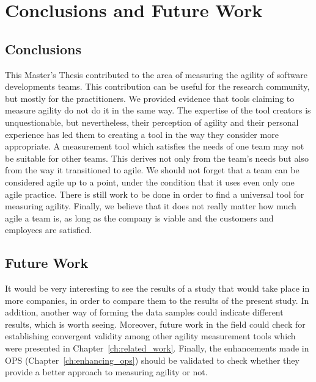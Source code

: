 \chapter{Conclusions and Future Work}
\label{ch:conclusions_future_work}

\section{Conclusions}

This Master's Thesis contributed to the area of measuring the agility of software developments teams. This contribution can be useful for the research community, but mostly for the practitioners. We provided evidence that tools claiming to measure agility do not do it in the same way. The expertise of the tool creators is unquestionable, but nevertheless, their perception of agility and their personal experience has led them to creating a tool in the way they consider more appropriate. A measurement tool which satisfies the needs of one team may not be suitable for other teams. This derives not only from the team's needs but also from the way it transitioned to agile. We should not forget that a team can be considered agile up to a point, under the condition that it uses even only one agile practice. There is still work to be done in order to find a universal tool for measuring agility. Finally, we believe that it does not really matter how much agile a team is, as long as the company is viable and the customers and employees are satisfied.

\section{Future Work}

It would be very interesting to see the results of a study that would take place in more companies, in order to compare them to the results of the present study. In addition, another way of forming the data samples could indicate different results, which is worth seeing. Moreover, future work in the field could check for establishing convergent validity among other agility measurement tools which were presented in Chapter~\ref{ch:related_work}. Finally, the enhancements made in \ac{OPS} (Chapter~\ref{ch:enhancing_ops}) should be validated to check whether they provide a better approach to measuring agility or not.